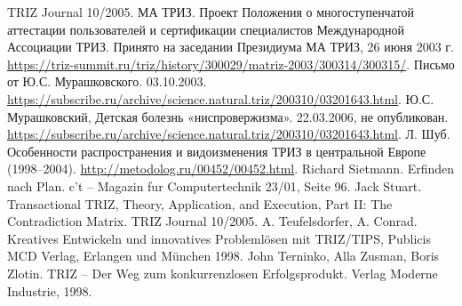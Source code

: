 \begin{thebibliography}{xxx}
  TRIZ Journal 10/2005.
 МА ТРИЗ. Проект Положения о многоступенчатой аттестации
  пользователей и сертификации специалистов Международной Ассоциации ТРИЗ.
  Принято на заседании Президиума МА ТРИЗ, 26 июня 2003 г.
  \url{https://triz-summit.ru/triz/history/300029/matriz-2003/300314/300315/}.
 Письмо от Ю.С. Мурашковского. 03.10.2003.
  \url{https://subscribe.ru/archive/science.natural.triz/200310/03201643.html}.
 Ю.С. Мурашковский, Детская болезнь
  «ниспровержизма». 22.03.2006, не опубликован.
  \url{https://subscribe.ru/archive/science.natural.triz/200310/03201643.html}.
 Л. Шуб. Особенности распространения и видоизменения ТРИЗ в
  центральной Европе (1998--2004).
  \url{http://metodolog.ru/00452/00452.html}.
 Richard Sietmann. Erfinden nach Plan. c't -- Magazin
  fur Computertechnik 23/01, Seite 96.
 Jack Stuart. Transactional TRIZ, Theory, Application, and
  Execution, Part II: The Contradiction Matrix. TRIZ Journal 10/2005.
 A. Teufelsdorfer, A.  Conrad. Kreatives Entwickeln
  und innovatives Problemlösen mit TRIZ/TIPS, Publicis MCD Verlag, Erlangen
  und München 1998.
 John Terninko, Alla Zusman, Boris Zlotin. TRIZ -- Der
  Weg zum konkurrenzlosen Erfolgsprodukt. Verlag Moderne Industrie, 1998.
\end{thebibliography}

